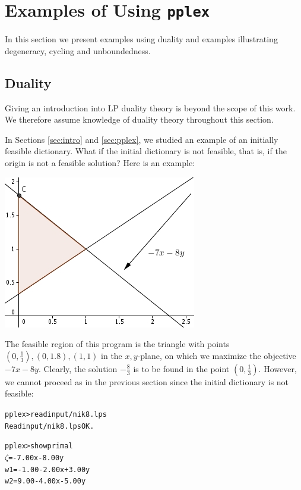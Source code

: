 \documentclass[ukenglish]{nik}
\begin{document}
\section{Examples of Using \texttt{pplex}}\label{sec:examples}
In this section we present examples using duality and examples illustrating
degeneracy, cycling and unboundedness.

\subsection{Duality}

Giving an introduction into LP duality theory is beyond the scope of this work. We therefore assume knowledge of duality theory throughout this section.

In Sections \ref{sec:intro} and \ref{sec:pplex}, we studied an example of an initially feasible dictionary.
What if the initial dictionary is not feasible, that is, if the origin is not a
feasible solution? Here is an example:

\begin{minipage}{.45\textwidth}
\begin{alltt}

\end{alltt}
\end{minipage}
\begin{minipage}{.45\textwidth}
	\includegraphics{ex_dual.jpg}
\end{minipage}
\vspace{.2cm}

The feasible region of this program is the
triangle with points $(0,\frac{1}{3}),(0,1.8),(1,1)$
in the $x,y$-plane, on which we maximize the objective $-7x-8y$.
Clearly, the solution $-\frac{8}{3}$ is to be found in the point $(0,\frac{1}{3})$.
However, we cannot proceed as in the previous section since the
initial dictionary is not feasible:
\begin{alltt}
pplex> read input/nik8.lps
Read input/nik8.lps OK.

pplex> show primal
 \(\zeta\) =        - 7.00x - 8.00y
w1 = - 1.00 - 2.00x + 3.00y
w2 =   9.00 - 4.00x - 5.00y
\end{alltt}
\end{document}

